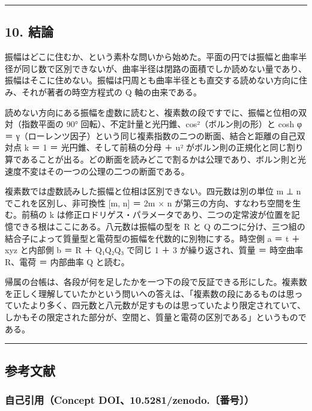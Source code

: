 \documentclass[
  a4paper,
]{ltjsarticle}
\begin{document}
\begin{center}\rule{0.5\linewidth}{0.5pt}\end{center}

\subsection{10. 結論}\label{ux7d50ux8ad6}

振幅はどこに住むか、という素朴な問いから始めた。平面の円では振幅と曲率半径が同じ数で区別できないが、曲率半径は閉路の面積でしか読めない量であり、振幅はそこに住めない。振幅は円周とも曲率半径とも直交する読めない方向に住み、それが著者の時空方程式の
Q 軸の由来である。

読めない方向にある振幅を虚数に読むと、複素数の段ですでに、振幅と位相の双対（指数平面の
90° 回転）、不定計量と光円錐、cos²（ボルン則の形）と cosh φ ＝
γ（ローレンツ因子）という同じ複素指数の二つの断面、結合と距離の自己双対点
\textbar k\textbar{} ＝ 1 ＝ 光円錐、そして前稿の分母  ＋
u\textbar²
がボルン則の正規化と同じ割り算であることが出る。どの断面を読みどこで割るかは公理であり、ボルン則と光速度不変はその一つの公理の二つの断面である。

複素数では虚数読みした振幅と位相は区別できない。四元数は別の単位 m ⊥ n
でこれを区別し、非可換性 {[}m, n{]} ＝ 2m × n
が第三の方向、すなわち空間を生む。前稿の k
は修正ロドリゲス・パラメータであり、二つの定常波が位置を記憶できる根はここにある。八元数は振幅の型を
R と Q
の二つに分け、三つ組の結合子によって質量型と電荷型の振幅を代数的に別物にする。時空側
a ＝ t ＋ xyz と内部側 b ＝ R ＋ Q₁Q₂Q₃ で同じ 1 ＋ 3 が繰り返され、質量
＝ 時空曲率 R、電荷 ＝ 内部曲率 Q と読む。

帰属の台帳は、各段が何を足したかを一つ下の段で反証できる形にした。複素数を正しく理解していたかという問いへの答えは、「複素数の段にあるものは思っていたより多く、四元数と八元数が足すものは思っていたより限定されていて、しかもその限定された部分が、空間と、質量と電荷の区別である」というものである。

\begin{center}\rule{0.5\linewidth}{0.5pt}\end{center}

\subsection{参考文献}\label{ux53c2ux8003ux6587ux732e}

\subsubsection{自己引用（Concept
DOI、10.5281/zenodo.〔番号〕）}\label{ux81eaux5df1ux5f15ux7528concept-doi10.5281zenodo.ux756aux53f7}
\end{document}
